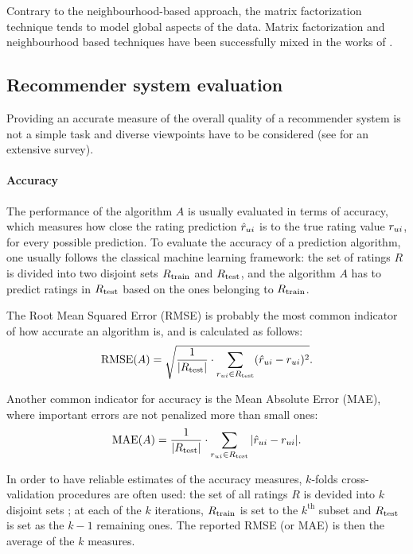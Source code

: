 Contrary to the neighbourhood-based approach, the matrix factorization
technique tends to model global aspects of the data.  Matrix factorization and
neighbourhood based techniques have been successfully mixed in the works of
\cite{KorACM2010}.


\subsection{Recommender system
evaluation}\label{eval} Providing an accurate measure of the overall quality of
a recommender system is not a simple task and diverse viewpoints have to be
considered (see \cite{RecoSystemHandbook} for an extensive survey).

\paragraph{Accuracy\\}
The performance of the algorithm $A$ is usually evaluated in terms of accuracy,
which measures how close the rating prediction $\hat{r}_{ui}$ is to the true
rating value $r_{ui}$, for every possible prediction. To evaluate the accuracy
of a prediction algorithm, one usually follows the classical machine learning
framework: the set of ratings $R$ is divided into two disjoint sets $R_{\text{train}}$
and $R_{\text{test}}$, and the algorithm $A$ has to predict ratings in $R_{\text{test}}$
based on the ones belonging to $R_{\text{train}}$.

The Root Mean Squared Error (RMSE) is probably the most common indicator of
how accurate an algorithm is, and is calculated as follows:
$$\text{RMSE}(A) = \sqrt{\frac{1}{|R_{\text{test}}|} \cdot \sum_{r_{ui} \in
R_{\text{test}}}(\hat{r}_{ui} - r_{ui})^2}.$$

Another common indicator for accuracy is the Mean Absolute Error (MAE), where
important errors are not penalized more than small ones:
$$\text{MAE}(A) = \frac{1}{|R_{\text{test}}|} \cdot \sum_{r_{ui} \in R_{\text{test}}}|\hat{r}_{ui} -
r_{ui}|.$$

In order to have reliable estimates of the accuracy measures, $k$-folds
cross-validation procedures are often used: the set of all ratings $R$ is
devided into $k$ disjoint sets ; at each of the $k$ iterations, $R_{\text{train}}$ is set
to the $k^{\text{th}}$ subset and $R_{\text{test}}$ is set as the $k - 1$ remaining
ones. The reported RMSE (or MAE) is then the average of the $k$ measures.

